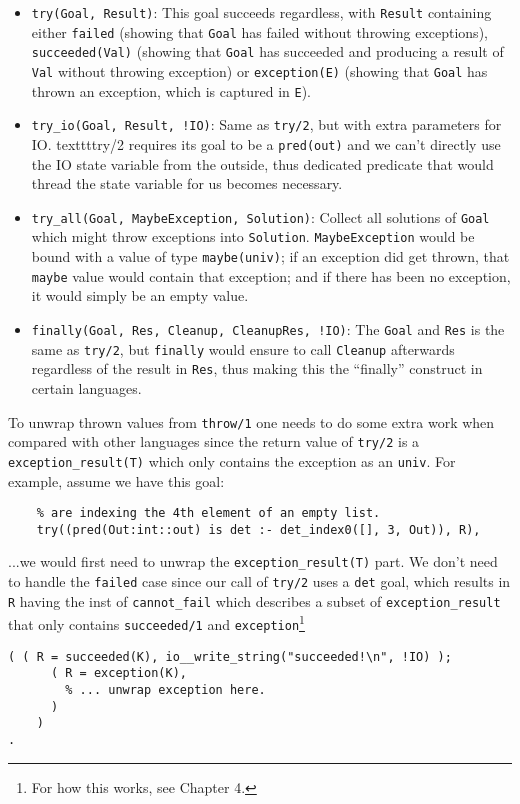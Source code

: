 \begin{itemize}
\item \texttt{try(Goal, Result)}: This goal succeeds regardless, with \texttt{Result} containing either \texttt{failed} (showing that \texttt{Goal} has failed without throwing exceptions), \texttt{succeeded(Val)} (showing that \texttt{Goal} has succeeded and producing a result of \texttt{Val} without throwing exception) or \texttt{exception(E)} (showing that \texttt{Goal} has thrown an exception, which is captured in \texttt{E}).
\item \texttt{try_io(Goal, Result, !IO)}: Same as \texttt{try/2}, but with extra parameters for IO. texttt{try/2} requires its goal to be a \texttt{pred(out)} and we can't directly use the IO state variable from the outside, thus dedicated predicate that would thread the state variable for us becomes necessary.
\item \texttt{try_all(Goal, MaybeException, Solution)}: Collect all solutions of \texttt{Goal} which might throw exceptions into \texttt{Solution}. \texttt{MaybeException} would be bound with a value of type \texttt{maybe(univ)}; if an exception did get thrown, that \texttt{maybe} value would contain that exception; and if there has been no exception, it would simply be an empty value.
  \item \texttt{finally(Goal, Res, Cleanup, CleanupRes, !IO)}: The \texttt{Goal} and \texttt{Res} is the same as \texttt{try/2}, but \texttt{finally} would ensure to call \texttt{Cleanup} afterwards regardless of the result in \texttt{Res}, thus making this the ``finally'' construct in certain languages. 
  \end{itemize}

  To unwrap thrown values from \texttt{throw/1} one needs to do some extra work when compared with other languages since the return value of \texttt{try/2} is a \texttt{exception_result(T)} which only contains the exception as an \texttt{univ}. For example, assume we have this goal:

\begin{lstlisting}[language=Mercury]
    % this goal would definitely throw an exception since we
    % are indexing the 4th element of an empty list.
	try((pred(Out:int::out) is det :- det_index0([], 3, Out)), R),
\end{lstlisting}

...we would first need to unwrap the \texttt{exception_result(T)} part. We don't need to handle the \texttt{failed} case since our call of \texttt{try/2} uses a \texttt{det} goal, which results in \texttt{R} having the inst of \texttt{cannot_fail} which describes a subset of \texttt{exception_result} that only contains \texttt{succeeded/1} and \texttt{exception}\footnote{For how this works, see Chapter 4.}
\begin{lstlisting}[language=Mercury]
	( ( R = succeeded(K), io__write_string("succeeded!\n", !IO) );
	  ( R = exception(K),
        % ... unwrap exception here.
      )
	)
.
\end{lstlisting}

